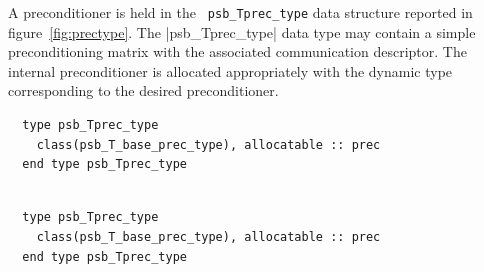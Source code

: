  A preconditioner is held in the \hypertarget{precdata}{{\tt
    psb\_Tprec\_type}} data structure reported in 
figure~\ref{fig:prectype}. The \fortinline|psb_Tprec_type| 
data type may contain a simple preconditioning matrix with the
associated communication descriptor.
The internal preconditioner is allocated appropriately with the
dynamic type corresponding to the desired preconditioner. 
\begin{listing}[h!]
\ifpdf
\begin{verbatim}
  type psb_Tprec_type
    class(psb_T_base_prec_type), allocatable :: prec
  end type psb_Tprec_type
\end{verbatim}
\else
  \small
\begin{center}
    \begin{minipage}[tl]{0.9\textwidth}
\begin{verbatim}

  type psb_Tprec_type
    class(psb_T_base_prec_type), allocatable :: prec
  end type psb_Tprec_type

\end{verbatim}
    \end{minipage}
  \end{center}
\fi
  \caption{\label{fig:prectype}The PSBLAS defined data type that contains a preconditioner.}
\end{listing}

